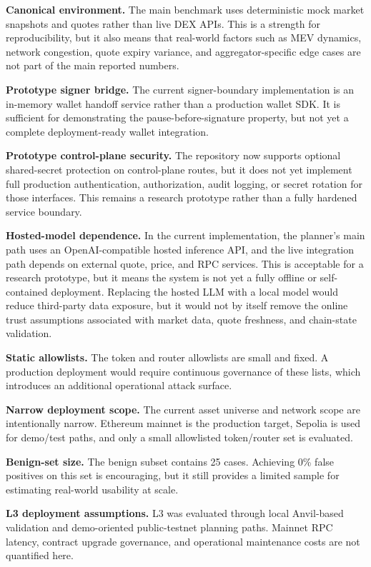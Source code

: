 ﻿\documentclass[conference]{IEEEtran}
\begin{document}
\textbf{Canonical environment.} The main benchmark uses deterministic mock
market snapshots and quotes rather than live DEX APIs. This is a strength for
reproducibility, but it also means that real-world factors such as MEV
dynamics, network congestion, quote expiry variance, and aggregator-specific
edge cases are not part of the main reported numbers.

\textbf{Prototype signer bridge.} The current signer-boundary implementation is
an in-memory wallet handoff service rather than a production wallet SDK. It is
sufficient for demonstrating the pause-before-signature property, but not yet a
complete deployment-ready wallet integration.

\textbf{Prototype control-plane security.} The repository now supports optional
shared-secret protection on control-plane routes, but it does not yet implement
full production authentication, authorization, audit logging, or secret
rotation for those interfaces. This remains a research prototype rather than a
fully hardened service boundary.

\textbf{Hosted-model dependence.} In the current implementation, the planner's
main path uses an OpenAI-compatible hosted inference API, and the live
integration path depends on external quote, price, and RPC services. This is
acceptable for a research prototype, but it means the system is not yet a
fully offline or self-contained deployment. Replacing the hosted LLM with a
local model would reduce third-party data exposure, but it would not by itself
remove the online trust assumptions associated with market data, quote
freshness, and chain-state validation.

\textbf{Static allowlists.} The token and router allowlists are small and fixed.
A production deployment would require continuous governance of these lists,
which introduces an additional operational attack surface.

\textbf{Narrow deployment scope.} The current asset universe and network scope
are intentionally narrow. Ethereum mainnet is the production target, Sepolia is
used for demo/test paths, and only a small allowlisted token/router set is
evaluated.

\textbf{Benign-set size.} The benign subset contains 25 cases. Achieving 0\%
false positives on this set is encouraging, but it still provides a limited
sample for estimating real-world usability at scale.

\textbf{L3 deployment assumptions.} L3 was evaluated through local Anvil-based
validation and demo-oriented public-testnet planning paths. Mainnet RPC
latency, contract upgrade governance, and operational maintenance costs are not
quantified here.
\end{document}
